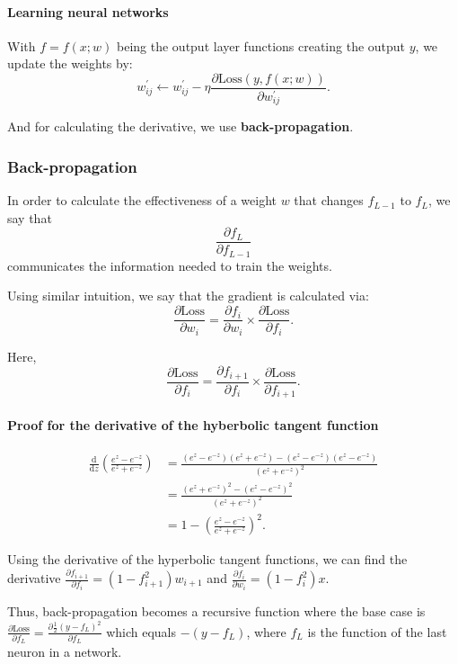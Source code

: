 \documentclass{article}
\begin{document}
\paragraph{Learning neural networks} With $f=f(x;w)$ being the output layer functions creating the output $y$, we update the weights by: 
\[w_{ij}^{'}\leftarrow w_{ij}^{'} -\eta\frac{\partial\text{Loss}\left(y,f(x;w)\right)}{\partial w_{ij}^{'}}.\]

And for calculating the derivative, we use \textbf{back-propagation}.

\subsubsection{Back-propagation}
In order to calculate the effectiveness of a weight $w$ that changes $f_{L-1}$ to $f_{L}$, we say that $$\frac{\partial f_{L}}{\partial f_{L-1}}$$ communicates the information needed to train the weights.

Using similar intuition, we say that the gradient is calculated via: 
\[\frac{\partial\text{Loss}}{\partial w_i}=\frac{\partial f_i}{\partial w_i}\times\frac{\partial\text{Loss}}{\partial f_i}.\]

Here, $$\frac{\partial\text{Loss}}{\partial f_i}=\frac{\partial f_{i+1}}{\partial f_i}\times \frac{\partial\text{Loss}}{\partial f_{i+1}}.$$

\paragraph{Proof for the derivative of the hyberbolic tangent function}
\begin{align*}
	\frac{\text{d}}{\text{d}z}\left(\frac{e^z-e^{-z}}{e^z+e^{-z}}\right) &= \frac{(e^z-e^{-z})(e^z+e^{-z})-(e^z-e^{-z})(e^z-e^{-z})}{(e^z+e^{-z})^2}\\
	&= \frac{(e^z+e^{-z})^2-(e^z-e^{-z})^2}{(e^z+e^{-z})^2}\\
	&= 1 - \left(\frac{e^z-e^{-z}}{e^z+e^{-z}}\right)^2.
\end{align*}

Using the derivative of the hyperbolic tangent functions, we can find the derivative $\frac{\partial f_{i+1}}{\partial f_i}=(1-f_{i+1}^2)w_{i+1}$ and $\frac{\partial f_i}{\partial w_i}=(1-f_i^2)x$.

Thus, back-propagation becomes a recursive function where the base case is $\frac{\partial\text{Loss}}{\partial f_L}=\frac{\partial\frac{1}{2}(y-f_L)^2}{\partial f_L}$ which equals $-(y-f_L)$, where $f_L$ is the function of the last neuron in a network.
\end{document}
